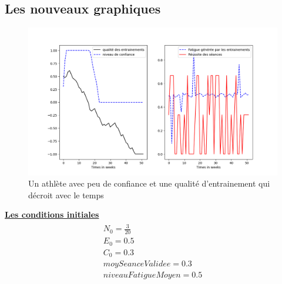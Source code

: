 \documentclass[
]{article}
\begin{document}
		\hypertarget{ss22}{%
		\subsection{Les nouveaux graphiques }\label{ss22}}
		\begin{figure}[H]
			\centering
			\includegraphics[width=\textwidth]{Graph1SImu2}
			\caption{Un athlète avec peu de confiance et une qualité d'entrainement qui décroit avec le temps}
			\label{fig:2_1}
		\end{figure}
		\underline{\textbf{Les conditions initiales}}
		\begin{align*}
			\boxed{\begin{array}{c} N_0=\frac{3}{20} \\ E_0=0.5 \\
					C_0=0.3 \\
					moySeanceValidee=0.3 \\
					niveauFatigueMoyen=0.5
			\end{array}}
		\end{align*}
\end{document}
